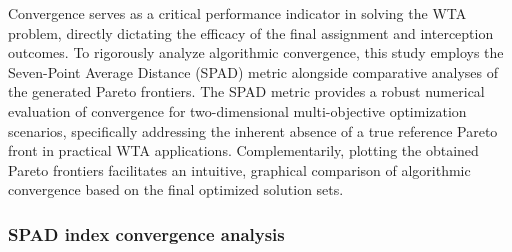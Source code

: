 \documentclass[lettersize,journal]{IEEEtran}
\begin{document}
Convergence serves as a critical performance indicator in solving the WTA problem, directly dictating the efficacy of the final assignment and interception outcomes. To rigorously analyze algorithmic convergence, this study employs the Seven-Point Average Distance (SPAD) metric alongside comparative analyses of the generated Pareto frontiers. The SPAD metric provides a robust numerical evaluation of convergence for two-dimensional multi-objective optimization scenarios, specifically addressing the inherent absence of a true reference Pareto front in practical WTA applications. Complementarily, plotting the obtained Pareto frontiers facilitates an intuitive, graphical comparison of algorithmic convergence based on the final optimized solution sets.

\subsubsection{SPAD index convergence analysis}
\end{document}
